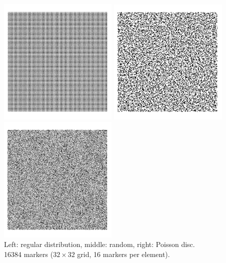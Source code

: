 \begin{center}
\includegraphics[width=5.7cm]{python_codes/fieldstone_13/images/markers_reg} 
\includegraphics[width=5.7cm]{python_codes/fieldstone_13/images/markers_rand} 
\includegraphics[width=5.7cm]{python_codes/fieldstone_13/images/markers_pd} \\
{\captionfont Left: regular distribution, middle: random, right: Poisson disc.\\
 16384 markers ($32 \times 32$ grid, 16 markers per element).}
\end{center}



